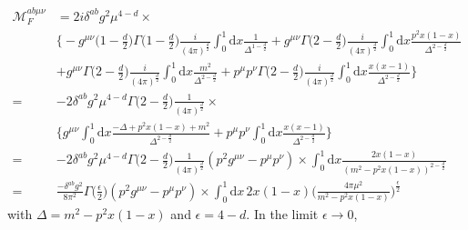 \documentclass[a4paper,12pt]{article}
\renewcommand{\d}{\mathrm{d}}
\begin{document}
\begin{equation}
    \begin{split}
    \mathcal{M}_{F}^{ab \mu \nu}&=2i \delta^{ab}g^2 \mu^{4-d}\times\\
    &\Bigg\{-g^{\mu \nu}\Big(1-\frac{d}{2}\Big)\Gamma\Big(1-\frac{d}{2}\Big)\frac{i}{(4\pi)^{\frac{d}{2}}}\int_0^1 \d x\frac{1}{\Delta^{1-\frac{d}{2}}}+g^{\mu \nu}\Gamma\Big(2-\frac{d}{2}\Big)\frac{i}{(4\pi)^{\frac{d}{2}}}\int_0^1 \d x\frac{p^2x(1-x)}{\Delta^{2-\frac{d}{2}}}\\
    &+g^{\mu \nu}\Gamma\Big(2-\frac{d}{2}\Big)\frac{i}{(4\pi)^{\frac{d}{2}}}\int_0^1 \d x\frac{m^2}{\Delta^{2-\frac{d}{2}}}+p^\mu p^\nu\Gamma\Big(2-\frac{d}{2}\Big)\frac{i}{(4\pi)^{\frac{d}{2}}}\int_0^1 \d x\frac{x(x-1)}{\Delta^{2-\frac{d}{2}}}\Bigg\}\\
    =&-2\delta^{ab}g^2 \mu^{4-d}\Gamma\Big(2-\frac{d}{2}\Big)\frac{1}{(4\pi)^{\frac{d}{2}}}\times\\
    &\Bigg\{g^{\mu \nu}\int_0^1 \d x\frac{-\Delta+p^2x(1-x)+m^2}{\Delta^{2-\frac{d}{2}}}+p^\mu p^\nu\int_0^1 \d x\frac{x(x-1)}{\Delta^{2-\frac{d}{2}}}\Bigg\}\\
    =&-2\delta^{ab}g^2 \mu^{4-d}\Gamma\Big(2-\frac{d}{2}\Big)\frac{1}{(4\pi)^{\frac{d}{2}}}(p^2g^{\mu \nu}-p^\mu p^\nu)\times\int_0^1 \d x\frac{2x(1-x)}{(m^2-p^2x(1-x))^{2-\frac{d}{2}}}\\
    =&\frac{-\delta^{ab}g^2}{8\pi^2} \Gamma\Big(\frac{\epsilon}{2}\Big)(p^2g^{\mu \nu}-p^\mu p^\nu)\times\int_0^1 \d x\,2x(1-x)\bigg(\frac{4\pi \mu^2}{m^2-p^2x(1-x)}\bigg)^{\frac{\epsilon}{2}}
\end{split}
\end{equation}
with $\Delta=m^2-p^2x(1-x)$ and $\epsilon=4-d$. In the limit $\epsilon\to 0$,
\end{document}
